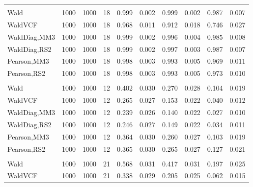 \documentclass[
]{article}
\begin{document}
\begin{table}[H]
{\begin{tabular}[t]{lrrrrrrlrr}
\addlinespace[0.3em]
\multicolumn{10}{l}{\textbf{1F 15V}}\\
\hspace{1em}Wald & 1000 & 1000 & 18 & 0.999 & 0.002 & 0.999 & 0.002 & 0.987 & 0.007\\
\hspace{1em}WaldVCF & 1000 & 1000 & 18 & 0.968 & 0.011 & 0.912 & 0.018 & 0.746 & 0.027\\
\hspace{1em}WaldDiag,MM3 & 1000 & 1000 & 18 & 0.999 & 0.002 & 0.996 & 0.004 & 0.985 & 0.008\\
\hspace{1em}WaldDiag,RS2 & 1000 & 1000 & 18 & 0.999 & 0.002 & 0.997 & 0.003 & 0.987 & 0.007\\
\hspace{1em}Pearson,MM3 & 1000 & 1000 & 18 & 0.998 & 0.003 & 0.993 & 0.005 & 0.969 & 0.011\\
\hspace{1em}Pearson,RS2 & 1000 & 1000 & 18 & 0.998 & 0.003 & 0.993 & 0.005 & 0.973 & 0.010\\
\addlinespace[0.3em]
\multicolumn{10}{l}{\textbf{2F 10V}}\\
\hspace{1em}Wald & 1000 & 1000 & 12 & 0.402 & 0.030 & 0.270 & 0.028 & 0.104 & 0.019\\
\hspace{1em}WaldVCF & 1000 & 1000 & 12 & 0.265 & 0.027 & 0.153 & 0.022 & 0.040 & 0.012\\
\hspace{1em}WaldDiag,MM3 & 1000 & 1000 & 12 & 0.239 & 0.026 & 0.140 & 0.022 & 0.027 & 0.010\\
\hspace{1em}WaldDiag,RS2 & 1000 & 1000 & 12 & 0.246 & 0.027 & 0.149 & 0.022 & 0.034 & 0.011\\
\hspace{1em}Pearson,MM3 & 1000 & 1000 & 12 & 0.364 & 0.030 & 0.260 & 0.027 & 0.103 & 0.019\\
\hspace{1em}Pearson,RS2 & 1000 & 1000 & 12 & 0.365 & 0.030 & 0.265 & 0.027 & 0.127 & 0.021\\
\addlinespace[0.3em]
\multicolumn{10}{l}{\textbf{3F 15V}}\\
\hspace{1em}Wald & 1000 & 1000 & 21 & 0.568 & 0.031 & 0.417 & 0.031 & 0.197 & 0.025\\
\hspace{1em}WaldVCF & 1000 & 1000 & 21 & 0.338 & 0.029 & 0.205 & 0.025 & 0.062 & 0.015\\

\end{tabular}}
\end{table}
\end{document}
